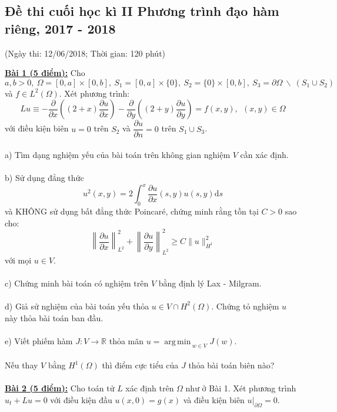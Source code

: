 \documentclass[10.5pt, a4paper]{article}
\DeclareMathOperator*{\argmin}{arg\,min\,}
\begin{document}
	\subsection{Đề thi cuối học kì II Phương trình đạo hàm riêng, 2017 - 2018}
	\begin{center}
		\color{blue}(Ngày thi: 12/06/2018; Thời gian: 120 phút)
	\end{center}
\color{red}\underline{\textbf{Bài 1 (5 điểm):}} \color{black}Cho $a,b>0,~\Omega=[0,a]\times[0,b],~S_1=[0,a]\times\{0\},~S_2=\{0\}\times[0,b],~S_3=\partial\Omega~\backslash~(S_1\cup S_2)$ và $f\in L^2(\Omega)$. Xét phương trình: $$Lu\equiv-\dfrac{\partial}{\partial x}\left((2+x)\dfrac{\partial u}{\partial x}\right)-\dfrac{\partial}{\partial y}\left((2+y)\dfrac{\partial u}{\partial y}\right)=f(x,y),~~(x,y)\in\Omega$$
với điều kiện biên $u=0$ trên $S_2$ và $\dfrac{\partial u}{\partial n}=0$ trên $S_1\cup S_3$.\\\\
\color{red}a) \color{black}Tìm dạng nghiệm yếu của bài toán trên không gian nghiệm $V$ cần xác định.\\\\
\color{red}b) \color{black}Sử dụng đẳng thức $$u^2(x,y)=2\displaystyle\int_0^x\dfrac{\partial u}{\partial x}(s,y)u(s,y)\text{d}s$$ và KHÔNG sử dụng bất đẳng thức Poincaré, chứng minh rằng tồn tại $C>0$ sao cho: $$\left\lVert\dfrac{\partial u}{\partial x}\right\rVert_{L^2}^2+\left\lVert\dfrac{\partial u}{\partial y}\right\rVert_{L^2}^2\ge C\lVert u\rVert_{H^1}^2$$
với mọi $u\in V$.\\\\
\color{red}c) \color{black}Chứng minh bài toán có nghiệm trên $V$ bằng định lý Lax - Milgram.\\\\
\color{red}d) \color{black}Giả sử nghiệm của bài toán yếu thỏa $u\in V\cap H^2(\Omega)$. Chứng tỏ nghiệm $u$ này thỏa bài toán ban đầu.\\\\
\color{red}e) \color{black}Viết phiếm hàm $J:V\rightarrow\mathbb R$ thỏa mãn $u=\displaystyle\argmin_{w\in V}J(w)$.\\\\
\text{~~~}Nếu thay $V$ bằng $H^1(\Omega)$ thì điểm cực tiểu của $J$ thỏa bài toán biên nào?\\\\
\color{red}\underline{\textbf{Bài 2 (5 điểm):}} \color{black}Cho toán tử $L$ xác định trên $\Omega$ như ở Bài 1. Xét phương trình $u_t+Lu=0$ với điều kiện đầu $u(x,0)=g(x)$ và điều kiện biên $u\big|_{\partial\Omega}=0.$\\\\
\end{document}
